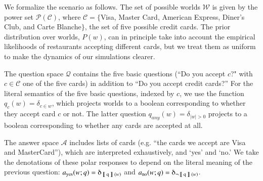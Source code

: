 \documentclass[11pt, floatsintext]{apa6}
\newcommand{\den}[2][]{
\(
\left\llbracket\;\text{#2}\;\right\rrbracket^{#1}
\)
}
\begin{document}
We formalize the scenario as follows. The set of possible worlds $\mathcal{W}$ is given by the power set $\mathcal{P}(\mathcal{C})$, where $\mathcal{C} = \{$Visa, Master Card, American Express, Diner's Club, and Carte Blanche$\}$, the set of five possible credit cards. %
The prior distribution over worlds, $P(w)$, can in principle take into account the empirical likelihoods of restaurants accepting different cards, but we treat them as uniform to make the dynamics of our simulations clearer. %

The question space $\mathcal{Q}$ contains the five basic questions (``Do you accept $c$?" with $c \in \mathcal{C}$ one of the five cards) in addition to ``Do you accept credit cards?'' For the literal semantics of the five basic questions, indexed by $c$, we use the function $q_c(w) = \delta_{c \in w}$, which projects worlds to a boolean corresponding to whether they accept card $c$ or not.
The latter question $q_{any}(w)  = \delta_{|w| > 0}$ projects to a boolean corresponding to whether any cards are accepted at all. %

The answer space $\mathcal{A}$ includes lists of cards (e.g. ``the cards we accept are Visa and MasterCard''), which are interpreted exhaustively, and  `yes' and `no.' We take the denotations of these polar responses to depend on the literal meaning of the previous question: $a_{\text{yes}}(w;q) = \delta_{\textrm{\den{q}}(w)}$ and $a_{\text{no}}(w;q) = \delta_{\neg \textrm{\den{q}}(w)}$.
\end{document}
